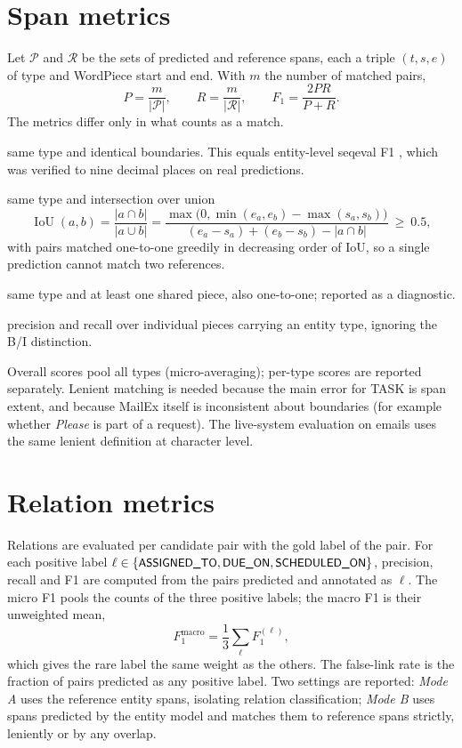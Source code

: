 \section{Span metrics}
Let $\mathcal{P}$ and $\mathcal{R}$ be the sets of predicted and reference spans, each a triple $(t, s, e)$ of type and WordPiece start and end. With $m$ the number of matched pairs,
\begin{equation}
P = \frac{m}{|\mathcal{P}|}, \qquad R = \frac{m}{|\mathcal{R}|}, \qquad F_1 = \frac{2PR}{P+R}.
\end{equation}
The metrics differ only in what counts as a match.
\begin{description}[leftmargin=1.6em, font=\normalfont\sffamily\small\bfseries\color{navy}]
  \item[Strict] same type and identical boundaries. This equals entity-level seqeval F1 \citep{nakayama2018seqeval}, which was verified to nine decimal places on real predictions.
  \item[Lenient] same type and intersection over union
  \begin{equation}
  \operatorname{IoU}(a,b) = \frac{|a\cap b|}{|a\cup b|} = \frac{\max\big(0, \min(e_a,e_b)-\max(s_a,s_b)\big)}{(e_a-s_a)+(e_b-s_b)-|a\cap b|} \ \ge\ 0.5,
  \end{equation}
  with pairs matched one-to-one greedily in decreasing order of IoU, so a single prediction cannot match two references.
  \item[Overlap-any] same type and at least one shared piece, also one-to-one; reported as a diagnostic.
  \item[Token] precision and recall over individual pieces carrying an entity type, ignoring the B/I distinction.
\end{description}
Overall scores pool all types (micro-averaging); per-type scores are reported separately. Lenient matching is needed because the main error for TASK is span extent, and because MailEx itself is inconsistent about boundaries (for example whether \emph{Please} is part of a request). The live-system evaluation on emails uses the same lenient definition at character level.

\section{Relation metrics}
Relations are evaluated per candidate pair with the gold label of the pair. For each positive label $\ell\in\{\lab{ASSIGNED\_TO},\lab{DUE\_ON},\lab{SCHEDULED\_ON}\}$, precision, recall and F1 are computed from the pairs predicted and annotated as $\ell$. The micro F1 pools the counts of the three positive labels; the macro F1 is their unweighted mean,
\begin{equation}
F_1^{\text{macro}} = \frac{1}{3}\sum_{\ell} F_1^{(\ell)},
\end{equation}
which gives the rare  label the same weight as the others. The false-link rate is the fraction of  pairs predicted as any positive label. Two settings are reported: \emph{Mode A} uses the reference entity spans, isolating relation classification; \emph{Mode B} uses spans predicted by the entity model and matches them to reference spans strictly, leniently or by any overlap.

